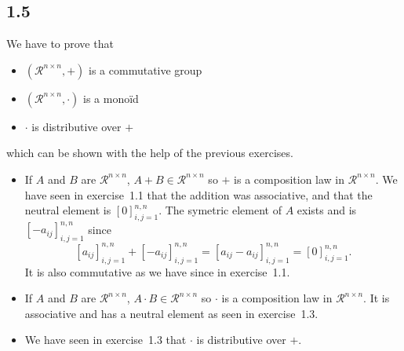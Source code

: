 \subsection*{1.5}
\begin{solution}
  We have to prove that
  \begin{itemize}
    \item $(\mathcal{R}^{n \times n}, +)$ is a commutative group
    \item $(\mathcal{R}^{n \times n}, \cdot)$ is a monoïd
    \item $\cdot$ is distributive over $+$
  \end{itemize}
  which can be shown with the help of the previous exercises.
  \begin{itemize}
    \item If $A$ and $B$ are $\mathcal{R}^{n \times n}$, $A+B \in \mathcal{R}^{n \times n}$
      so $+$ is a composition law in $\mathcal{R}^{n \times n}$.
      We have seen in exercise~1.1 that the addition was associative, and that the neutral element is
      $[0]_{i,j=1}^{n,n}$.
      The symetric element of $A$ exists and is $[-a_{ij}]_{i,j=1}^{n,n}$ since
      \[ [a_{ij}]_{i,j=1}^{n,n} + [-a_{ij}]_{i,j=1}^{n,n} = [a_{ij}-a_{ij}]_{i,j=1}^{n,n} = [0]_{i,j=1}^{n,n}. \]
      It is also commutative as we have since in exercise~1.1.
    \item If $A$ and $B$ are $\mathcal{R}^{n \times n}$, $A \cdot B \in \mathcal{R}^{n \times n}$
      so $\cdot$ is a composition law in $\mathcal{R}^{n \times n}$.
      It is associative and has a neutral element as seen in exercise~1.3.
    \item We have seen in exercise~1.3 that $\cdot$ is distributive over $+$.
  \end{itemize}
\end{solution}

